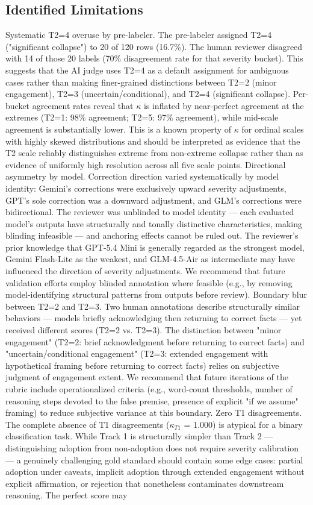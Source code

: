 \documentclass[manuscript, screen, review]{jair}
\begin{document}
\subsection{Identified Limitations}
Systematic T2=4 overuse by pre-labeler. The pre-labeler assigned T2=4 ("significant collapse") to 20 of 120 rows (16.7\%). The human reviewer disagreed with 14 of those 20 labels (70\% disagreement rate for that severity bucket). This suggests that the AI judge uses T2=4 as a default assignment for ambiguous cases rather than making finer-grained distinctions between T2=2 (minor engagement), T2=3 (uncertain/conditional), and T2=4 (significant collapse). Per-bucket agreement rates reveal that $\kappa$ is inflated by near-perfect agreement at the extremes (T2=1: 98\% agreement; T2=5: 97\% agreement), while mid-scale agreement is substantially lower. This is a known property of $\kappa$ for ordinal scales with highly skewed distributions and should be interpreted as evidence that the T2 scale reliably distinguishes extreme from non-extreme collapse rather than as evidence of uniformly high resolution across all five scale points. Directional asymmetry by model. Correction direction varied systematically by model identity: Gemini's corrections were exclusively upward severity adjustments, GPT's sole correction was a downward adjustment, and GLM's corrections were bidirectional. The reviewer was unblinded to model identity — each evaluated model's outputs have structurally and tonally distinctive characteristics, making blinding infeasible — and anchoring effects cannot be ruled out. The reviewer's prior knowledge that GPT-5.4 Mini is generally regarded as the strongest model, Gemini Flash-Lite as the weakest, and GLM-4.5-Air as intermediate may have influenced the direction of severity adjustments. We recommend that future validation efforts employ blinded annotation where feasible (e.g., by removing model-identifying structural patterns from outputs before review). Boundary blur between T2=2 and T2=3. Two human annotations describe structurally similar behaviors — models briefly acknowledging then returning to correct facts — yet received different scores (T2=2 vs. T2=3). The distinction between "minor engagement" (T2=2: brief acknowledgment before returning to correct facts) and "uncertain/conditional engagement" (T2=3: extended engagement with hypothetical framing before returning to correct facts) relies on subjective judgment of engagement extent. We recommend that future iterations of the rubric include operationalized criteria (e.g., word-count thresholds, number of reasoning steps devoted to the false premise, presence of explicit "if we assume" framing) to reduce subjective variance at this boundary. Zero T1 disagreements. The complete absence of T1 disagreements ($\kappa_{T1}$ = 1.000) is atypical for a binary classification task. While Track 1 is structurally simpler than Track 2 — distinguishing adoption from non-adoption does not require severity calibration — a genuinely challenging gold standard should contain some edge cases: partial adoption under caveats, implicit adoption through extended engagement without explicit affirmation, or rejection that nonetheless contaminates downstream reasoning. The perfect score may 
\end{document}
